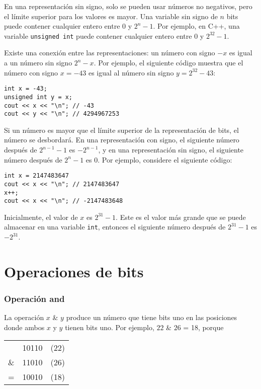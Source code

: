 En una representación sin signo, solo se pueden usar
números no negativos, pero el límite superior para los valores es mayor.
Una variable sin signo de $n$ bits puede contener cualquier
entero entre $0$ y $2^n-1$.
Por ejemplo, en C++, una variable \texttt{unsigned int}
puede contener cualquier entero entre $0$ y $2^{32}-1$.

Existe una conexión entre las
representaciones:
un número con signo $-x$ es igual a un número sin signo $2^n-x$.
Por ejemplo, el siguiente código muestra que
el número con signo $x=-43$ es igual al número sin signo
$y=2^{32}-43$:
\begin{lstlisting}
int x = -43;
unsigned int y = x;
cout << x << "\n"; // -43
cout << y << "\n"; // 4294967253
\end{lstlisting}

Si un número es mayor que el límite superior
de la representación de bits, el número se desbordará.
En una representación con signo,
el siguiente número después de $2^{n-1}-1$ es $-2^{n-1}$,
y en una representación sin signo,
el siguiente número después de $2^n-1$ es $0$.
Por ejemplo, considere el siguiente código:
\begin{lstlisting}
int x = 2147483647
cout << x << "\n"; // 2147483647
x++;
cout << x << "\n"; // -2147483648
\end{lstlisting}

Inicialmente, el valor de $x$ es $2^{31}-1$.
Este es el valor más grande que se puede almacenar
en una variable \texttt{int},
entonces el siguiente número después de $2^{31}-1$ es $-2^{31}$.


\section{Operaciones de bits}

\newcommand\XOR{\mathbin{\char`\^}}

\subsubsection{Operación and}


La operación  $x$ \& $y$ produce un número
que tiene bits uno en las posiciones donde ambos
$x$ y $y$ tienen bits uno.
Por ejemplo, $22$ \& $26$ = 18, porque

\begin{center}
\begin{tabular}{rrr}
& 10110 & (22)\\
\& & 11010 & (26) \\
\hline
 = & 10010 & (18) \\
\end{tabular}
\end{center}

